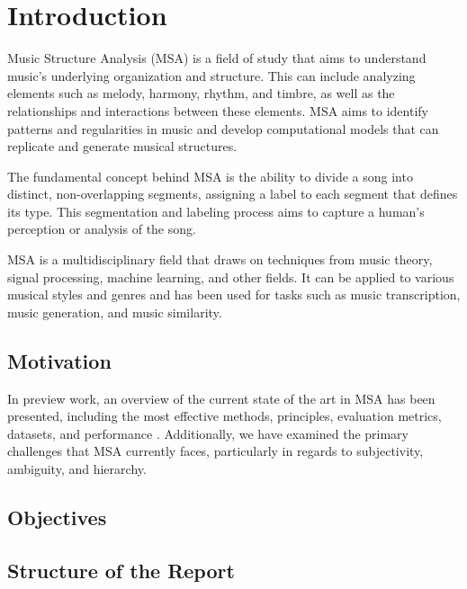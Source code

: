 \normallinespacing

\chapter{Introduction}

Music Structure Analysis (MSA) is a field of study that aims to understand music's underlying organization and structure. This can include analyzing elements such as melody, harmony, rhythm, and timbre, as well as the relationships and interactions between these elements. MSA aims to identify patterns and regularities in music and develop computational models that can replicate and generate musical structures.

The fundamental concept behind MSA is the ability to divide a song into distinct, non-overlapping segments, assigning a label to each segment that defines its type. This segmentation and labeling process aims to capture a human's perception or analysis of the song.

MSA is a multidisciplinary field that draws on techniques from music theory, signal processing, machine learning, and other fields. It can be applied to various musical styles and genres and has been used for tasks such as music transcription, music generation, and music similarity. 


\section{Motivation}

In preview work, an overview of the current state of the art in MSA has been presented, including the most effective methods, principles, evaluation metrics, datasets, and performance \cite{Nieto2020}. Additionally, we have examined the primary challenges that MSA currently faces, particularly in regards to subjectivity, ambiguity, and hierarchy.

\section{Objectives}
\section{Structure of the Report}


\newpage


